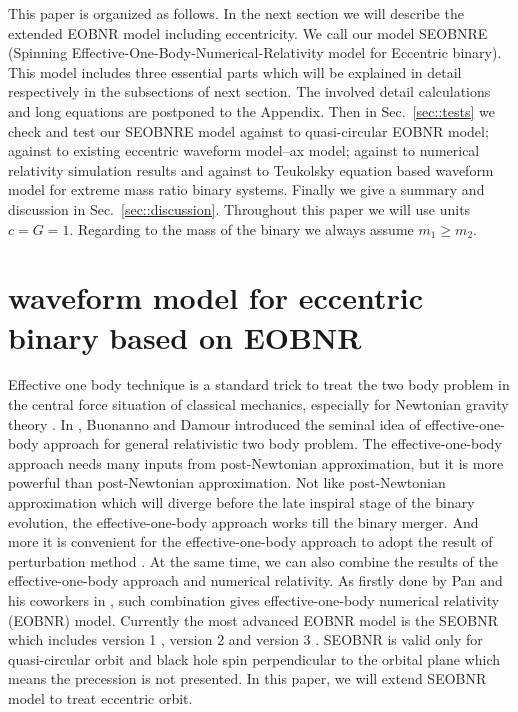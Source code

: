 \documentclass[prd,aps,a4paper,superscriptaddress,twocolumn,footinbib,showpacs]{revtex4}
\begin{document}
This paper is organized as follows. In the next section we will describe the extended EOBNR model including eccentricity. We call our model SEOBNRE (Spinning Effective-One-Body-Numerical-Relativity model for Eccentric binary). This model includes three essential parts which will be explained in detail respectively in the subsections of next section. The involved detail calculations and long equations are postponed to the Appendix. Then in Sec.~\ref{sec::tests} we check and test our SEOBNRE model against to quasi-circular EOBNR model; against to existing eccentric waveform model--ax model; against to numerical relativity simulation results and against to Teukolsky equation based waveform model for extreme mass ratio binary systems. Finally we give a summary and discussion in Sec.~\ref{sec::discussion}. Throughout this paper we will use units $c=G=1$. Regarding to the mass of the binary we always assume $m_1\geq m_2$.

\section{waveform model for eccentric binary based on EOBNR}
Effective one body technique is a standard trick to treat the two body problem in the central force situation of classical mechanics, especially for Newtonian gravity theory \cite{goldstein2002classical}. In \cite{buonanno1999effective}, Buonanno and Damour introduced the seminal idea of effective-one-body approach for general relativistic two body problem. The effective-one-body approach needs many inputs from post-Newtonian approximation, but it is more powerful than post-Newtonian approximation. Not like post-Newtonian approximation which will diverge before the late inspiral stage of the binary evolution, the effective-one-body approach works till the binary merger. And more it is convenient for the effective-one-body approach to adopt the result of perturbation method \cite{PhysRevLett.104.091102}. At the same time, we can also combine the results of the effective-one-body approach and numerical relativity. As firstly done by Pan and his coworkers in \cite{PhysRevD.76.104049}, such combination gives effective-one-body numerical relativity (EOBNR) model. Currently the most advanced EOBNR model is the SEOBNR which includes version 1 \cite{PhysRevD.86.024011}, version 2 \cite{PhysRevD.89.061502} and version 3 \cite{PhysRevX.6.041014,PhysRevD.95.024010,PhysRevLett.118.221101}. SEOBNR is valid only for quasi-circular orbit and black hole spin perpendicular to the orbital plane which means the precession is not presented. In this paper, we will extend SEOBNR model to treat eccentric orbit.
\end{document}
